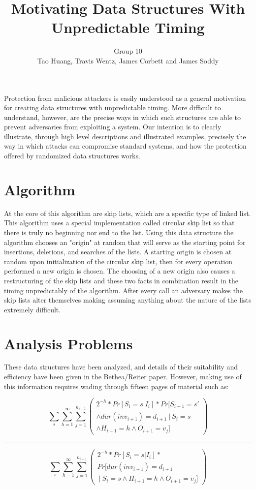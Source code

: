\documentclass[11pt,twocolumn]{article}
\title{Motivating Data Structures With Unpredictable Timing}
\author{Group 10\\
\small{Tao Huang, Travis Wentz, James Corbett and James Soddy}}
\begin{document}
\maketitle

Protection from malicious attackers is easily understood as a general motivation
for creating data structures with unpredictable timing. More difficult to understand,
however, are the precise ways in which such structures are able to prevent adversaries
from exploiting a system. Our intention is to clearly illustrate, through
high level descriptions and illustrated examples, precisely the way in which attacks
can compromise standard systems, and how the protection offered by randomized
data structures works.

\section{Algorithm}
 At the core of this algorithm are skip lists, which are a specific type of linked list. This algorithm uses a special implementation called circular skip list so that there is truly no beginning nor end to the list. Using this data structure the algorithm chooses an "origin" at random that will serve as the starting point for insertions, deletions, and searches of the lists. A starting origin is chosen at random upon initialization of the circular skip list, then for every operation performed a new origin is chosen. The choosing of a new origin also causes a restructuring of the skip lists and these two facts in combination result in the timing unpredictably of the algorithm. After every call an adversary makes the skip lists alter themselves making assuming anything about the nature of the lists extremely difficult. 
\section{Analysis Problems}
These data structures have been analyzed, and details of their suitability and
efficiency have been given in the Bethea/Reiter paper\cite{Bethea09}. However,
making use of this information requires wading through fifteen pages of material such as:

\begin{minipage}{.5\textwidth}

$$\sum_s\sum_{h=1}^\infty\sum_{j=1}^{n_{i+1}} \left( \begin{matrix}
2^{-h}*Pr[S_i=s | I_i]*Pr[S_{i+1}=s' \\ \land dur(inv_{i+1})=d_{i+1}\  
|\  S_i=s \\ \land H_{i+1}=h \land O_{i+1}=v_j] \end{matrix} \right)$$
\hrule
$$\sum_s\sum_{h=1}^\infty\sum_{j=1}^{n_{i+1}} 
\left( \begin{matrix}2^{-h}*Pr[S_i=s | I_i]*
\\Pr[ dur(inv_{i+1})=d_{i+1} \\ \  | \  S_i=s \land H_{i+1}=h \land O_{i+1}=v_j] \end{matrix} \right)$$

\end{minipage}
\end{document}
